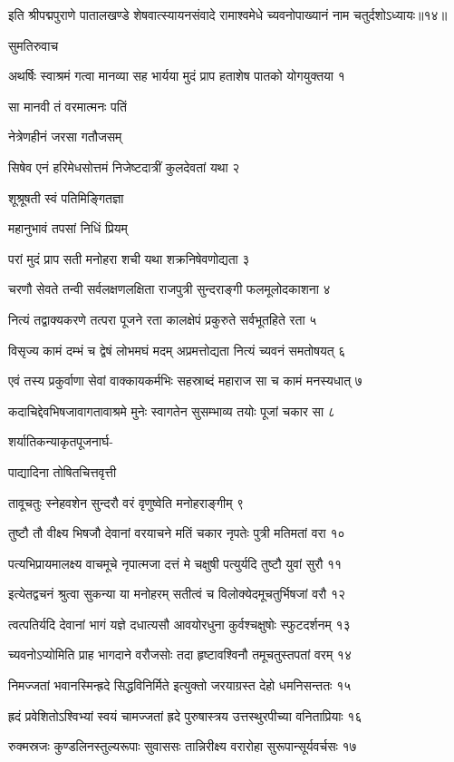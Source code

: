 इति श्रीपद्मपुराणे पातालखण्डे शेषवात्स्यायनसंवादे रामाश्वमेधे च्यवनोपाख्यानं नाम चतुर्दशोऽध्यायः॥१४॥


सुमतिरुवाच

अथर्षिः स्वाश्रमं गत्वा मानव्या सह भार्यया
मुदं प्राप हताशेष पातको योगयुक्तया १

सा मानवी तं वरमात्मनः पतिं

नेत्रेणहीनं जरसा गतौजसम्

सिषेव एनं हरिमेधसोत्तमं
निजेष्टदात्रीं कुलदेवतां यथा २

शूश्रूषती स्वं पतिमिङ्गितज्ञा

महानुभावं तपसां निधिं प्रियम्

परां मुदं प्राप सती मनोहरा
शची यथा शक्रनिषेवणोद्यता ३

चरणौ सेवते तन्वी सर्वलक्षणलक्षिता
राजपुत्री सुन्दराङ्गी फलमूलोदकाशना ४

नित्यं तद्वाक्यकरणे तत्परा पूजने रता
कालक्षेपं प्रकुरुते सर्वभूतहिते रता ५

विसृज्य कामं दम्भं च द्वेषं लोभमघं मदम्
अप्रमत्तोद्यता नित्यं च्यवनं समतोषयत् ६

एवं तस्य प्रकुर्वाणा सेवां वाक्कायकर्मभिः
सहस्राब्दं महाराज सा च कामं मनस्यधात् ७

कदाचिद्देवभिषजावागतावाश्रमे मुनेः
स्वागतेन सुसम्भाव्य तयोः पूजां चकार सा ८

शर्यातिकन्याकृतपूजनार्घ-

पाद्यादिना तोषितचित्तवृत्ती

तावूचतुः स्नेहवशेन सुन्दरौ
वरं वृणुष्वेति मनोहराङ्गीम् ९

तुष्टौ तौ वीक्ष्य भिषजौ देवानां वरयाचने
मतिं चकार नृपतेः पुत्री मतिमतां वरा १०

पत्यभिप्रायमालक्ष्य वाचमूचे नृपात्मजा
दत्तं मे चक्षुषी पत्युर्यदि तुष्टौ युवां सुरौ ११

इत्येतद्वचनं श्रुत्वा सुकन्या या मनोहरम्
सतीत्वं च विलोक्येदमूचतुर्भिषजां वरौ १२

त्वत्पतिर्यदि देवानां भागं यज्ञे दधात्यसौ
आवयोरधुना कुर्वश्चक्षुषोः स्फुटदर्शनम् १३

च्यवनोऽप्योमिति प्राह भागदाने वरौजसोः
तदा हृष्टावश्विनौ तमूचतुस्तपतां वरम् १४

निमज्जतां भवानस्मिन्ह्रदे सिद्धविनिर्मिते
इत्युक्तो जरयाग्रस्त देहो धमनिसन्ततः १५

ह्रदं प्रवेशितोऽश्विभ्यां स्वयं चामज्जतां ह्रदे
पुरुषास्त्रय उत्तस्थुरपीच्या वनिताप्रियाः १६

रुक्मस्रजः कुण्डलिनस्तुल्यरूपाः सुवाससः
तान्निरीक्ष्य वरारोहा सुरूपान्सूर्यवर्चसः १७

